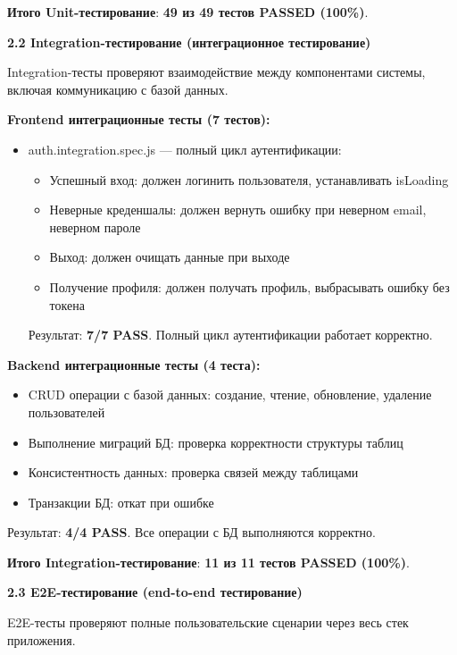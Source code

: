 \textbf{Итого Unit-тестирование}: \textbf{49 из 49 тестов PASSED (100\%)}.

\textbf{2.2 Integration-тестирование (интеграционное тестирование)}

Integration-тесты проверяют взаимодействие между компонентами системы, включая коммуникацию с базой данных.

\textbf{Frontend интеграционные тесты (7 тестов):}
\begin{itemize}
	\item auth.integration.spec.js --- полный цикл аутентификации:
	\begin{itemize}
		\item Успешный вход: должен логинить пользователя, устанавливать isLoading
		\item Неверные креденшалы: должен вернуть ошибку при неверном email, неверном пароле
		\item Выход: должен очищать данные при выходе
		\item Получение профиля: должен получать профиль, выбрасывать ошибку без токена
	\end{itemize}
	Результат: \textbf{7/7 PASS}. Полный цикл аутентификации работает корректно.
\end{itemize}

\textbf{Backend интеграционные тесты (4 теста):}
\begin{itemize}
	\item CRUD операции с базой данных: создание, чтение, обновление, удаление пользователей
	\item Выполнение миграций БД: проверка корректности структуры таблиц
	\item Консистентность данных: проверка связей между таблицами
	\item Транзакции БД: откат при ошибке
\end{itemize}
	Результат: \textbf{4/4 PASS}. Все операции с БД выполняются корректно.

\textbf{Итого Integration-тестирование}: \textbf{11 из 11 тестов PASSED (100\%)}.

\textbf{2.3 E2E-тестирование (end-to-end тестирование)}

E2E-тесты проверяют полные пользовательские сценарии через весь стек приложения.

